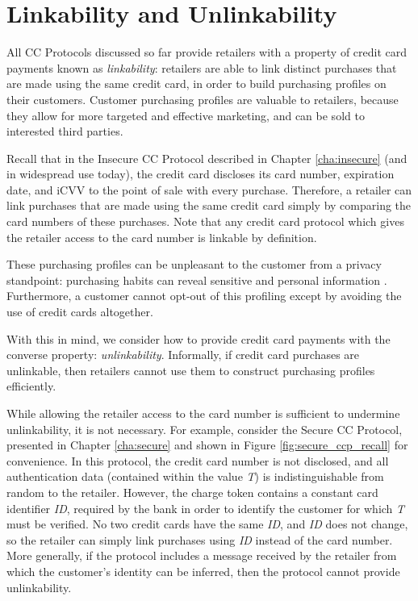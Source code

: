 \section{Linkability and Unlinkability}
\label{sec:unlinkability}

All CC Protocols discussed so far provide retailers with a property of credit card payments known as \emph{linkability}:
    retailers are able to link distinct purchases that are made using the same credit card, in order to build purchasing profiles on their customers.
Customer purchasing profiles are valuable to retailers, because they allow for more targeted and effective marketing, and can be sold to interested third parties.

Recall that in the Insecure CC Protocol described in Chapter \ref{cha:insecure} (and in widespread use today),
  the credit card discloses its card number, expiration date, and iCVV to the point of sale with every purchase.
Therefore, a retailer can link purchases that are made using the same credit card simply by comparing the card numbers of these purchases.
Note that any credit card protocol which gives the retailer access to the card number is linkable by definition.

These purchasing profiles can be unpleasant to the customer from a privacy standpoint:
  purchasing habits can reveal sensitive and personal information \cite{targetpregnant}.
Furthermore, a customer cannot opt-out of this profiling except by avoiding the use of credit cards altogether.

With this in mind, we consider how to provide credit card payments with the converse property: \emph{unlinkability}.
Informally, if credit card purchases are unlinkable, then retailers cannot use them to construct purchasing profiles efficiently.

While allowing the retailer access to the card number is sufficient to undermine unlinkability, it is not necessary.
For example, consider the Secure CC Protocol, presented in Chapter \ref{cha:secure} and shown in Figure \ref{fig:secure_ccp_recall} for convenience.
In this protocol, the credit card number is not disclosed, and all authentication data (contained within the value \emph{T}) is indistinguishable from random to the retailer.
However, the charge token contains a constant card identifier \emph{ID}, required by the bank in order to identify the customer for which \emph{T} must be verified.
No two credit cards have the same \emph{ID}, and \emph{ID} does not change, so the retailer can simply link purchases using \emph{ID} instead of the card number.
More generally, if the protocol includes a message received by the retailer from which the customer's identity can be inferred, then the protocol cannot provide unlinkability.

